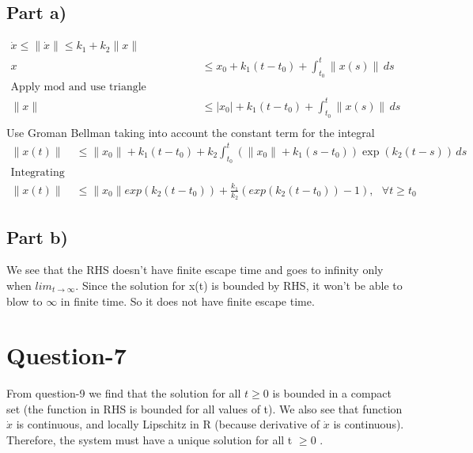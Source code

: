 \documentclass{article}
\begin{document}
\subsection*{Part a)}
\begin{align*}
    \dot{x} \leq \|\dot{x}\| \leq k_1 + k_2 \|x\| \\
    x &\leq x_0 + k_1(t-t_0) + \int_{t{_0}}^t\|x(s)\|\,ds \\
    \textrm{Apply mod and use triangle inequality in rhs} \\
    \|x\| &\leq |x_0| + k_1(t-t_0) + \int_{t_0}^t\|x(s)\|\,ds \\
\end{align*}
Use Groman Bellman taking into account the constant term for the integral
\begin{align*}
    \|x(t)\| &\leq \|x_0\| + k_1(t-t_0) + k_2\int_{t_0}^{t} (\|x_0\|+k_1(s-t_0))\exp(k_2(t-s))\,ds \\
    \textrm{Integrating by parts and simplifying,} \\
    \|x(t)\| &\leq \|x_0\|exp(k_2(t-t_0)) + \frac{k_1}{k_2}(exp(k_2(t-t_0))-1),\textrm{    }\forall t\ge t_0
\end{align*}

\subsection*{Part b)}
We see that the RHS doesn't have finite escape time and goes to infinity only when $lim_{t\to\infty}$. Since the solution for x(t) is bounded by RHS, it won't be able to blow to $\infty$ in finite time. So it does not have finite escape time.


\section*{Question-7}
From question-9 we find that the solution for all $t \geq 0$ is bounded in a compact set (the function in RHS is bounded for all values of t). We also see that function $\dot{x}$ is continuous, and locally Lipschitz in R (because derivative of $\dot{x}$ is continuous). Therefore, the system must have a unique solution for all t $\geq 0$ .
\end{document}
